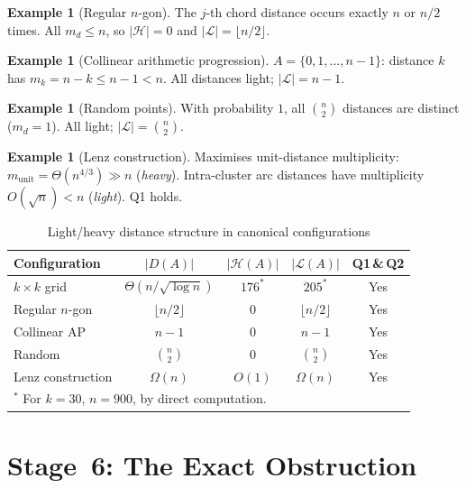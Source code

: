 \documentclass[12pt,a4paper]{amsart}
\theoremstyle{plain}
\theoremstyle{definition}
\newtheorem{example}[theorem]{Example}
\newcommand{\abs}[1]{\left\lvert #1 \right\rvert}
\newcommand{\cL}{\mathcal{L}}
\newcommand{\cH}{\mathcal{H}}
\begin{document}
\begin{example}[Regular $n$-gon]
\label{ex:polygon}
The $j$-th chord distance occurs exactly $n$ or $n/2$ times.
All $m_d \le n$, so $\abs{\cH} = 0$ and $\abs{\cL} = \lfloor n/2\rfloor$.
\end{example}

\begin{example}[Collinear arithmetic progression]
\label{ex:ap}
$A = \{0,1,\ldots,n-1\}$: distance $k$ has $m_k = n-k \le n-1 < n$.
All distances light; $\abs{\cL} = n-1$.
\end{example}

\begin{example}[Random points]
\label{ex:random}
With probability $1$, all $\binom{n}{2}$ distances are distinct
($m_d = 1$).  All light; $\abs{\cL} = \binom{n}{2}$.
\end{example}

\begin{example}[Lenz construction]
\label{ex:lenz}
Maximises unit-distance multiplicity: $m_{\mathrm{unit}} = \Theta(n^{4/3}) \gg n$
(\emph{heavy}).  Intra-cluster arc distances have multiplicity
$O(\sqrt{n}) < n$ (\emph{light}).  Q1 holds.
\end{example}

\begin{table}[ht]
\centering
\caption{Light/heavy distance structure in canonical configurations}
\label{tab:configs}
\begin{tabular}{lcccc}
\toprule
Configuration & $\abs{D(A)}$ & $\abs{\cH(A)}$ & $\abs{\cL(A)}$
              & Q1\,\&\,Q2 \\
\midrule
$k\times k$ grid   & $\Theta(n/\sqrt{\log n})$  & $176^*$ & $205^*$      & Yes \\
Regular $n$-gon    & $\lfloor n/2\rfloor$        & $0$      & $\lfloor n/2\rfloor$ & Yes \\
Collinear AP       & $n-1$                       & $0$      & $n-1$        & Yes \\
Random             & $\binom{n}{2}$              & $0$      & $\binom{n}{2}$& Yes \\
Lenz construction  & $\Omega(n)$                 & $O(1)$   & $\Omega(n)$  & Yes \\
\bottomrule
\multicolumn{5}{l}{${}^*$ For $k=30$, $n=900$, by direct computation.}
\end{tabular}
\end{table}

\section{Stage~6: The Exact Obstruction}
\label{sec:obstruction}
\end{document}
